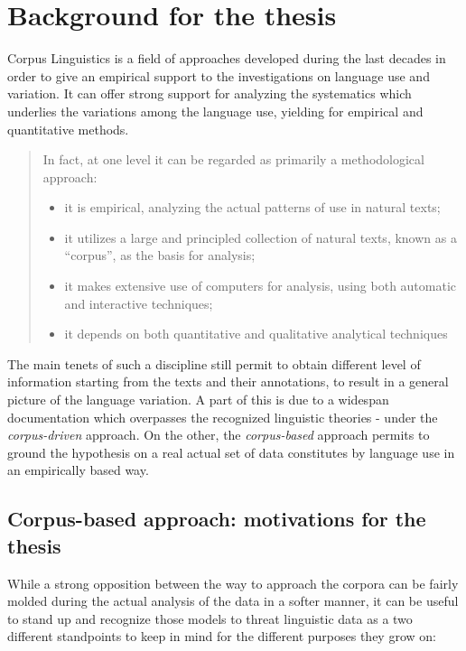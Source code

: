 \documentclass[a4paper,twoside,12pt,chapterprefix=false,bibliography=totocnumbered,listof=flat]{scrbook}
\providecommand{\tightlist}{%
  \setlength{\itemsep}{0pt}\setlength{\parskip}{0pt}}
\theoremstyle{definition}
\theoremstyle{definition}
\theoremstyle{definition}
\theoremstyle{remark}
\begin{document}
\section{Background for the thesis}\label{background-for-the-thesis}

Corpus Linguistics is a field of approaches developed during the last
decades in order to give an empirical support to the investigations on
language use and variation. It can offer strong support for analyzing
the systematics which underlies the variations among the language use,
yielding for empirical and quantitative methods.

\begin{quote}
In fact, at one level it can be regarded as primarily a methodological
approach:

\begin{itemize}
\tightlist
\item
  it is empirical, analyzing the actual patterns of use in natural
  texts;
\item
  it utilizes a large and principled collection of natural texts, known
  as a \enquote{corpus}, as the basis for analysis;
\item
  it makes extensive use of computers for analysis, using both automatic
  and interactive techniques;
\item
  it depends on both quantitative and qualitative analytical techniques
  \citep{biber1998}
\end{itemize}
\end{quote}

The main tenets of such a discipline still permit to obtain different
level of information starting from the texts and their annotations, to
result in a general picture of the language variation. A part of this is
due to a widespan documentation which overpasses the recognized
linguistic theories - under the \emph{corpus-driven} approach. On the
other, the \emph{corpus-based} approach permits to ground the hypothesis
on a real actual set of data constitutes by language use in an
empirically based way.

\subsection{Corpus-based approach: motivations for the
thesis}\label{corpus-based-approach-motivations-for-the-thesis}

While a strong opposition between the way to approach the corpora can be
fairly molded during the actual analysis of the data in a softer manner,
it can be useful to stand up and recognize those models to threat
linguistic data as a two different standpoints to keep in mind for the
different purposes they grow on:
\end{document}
